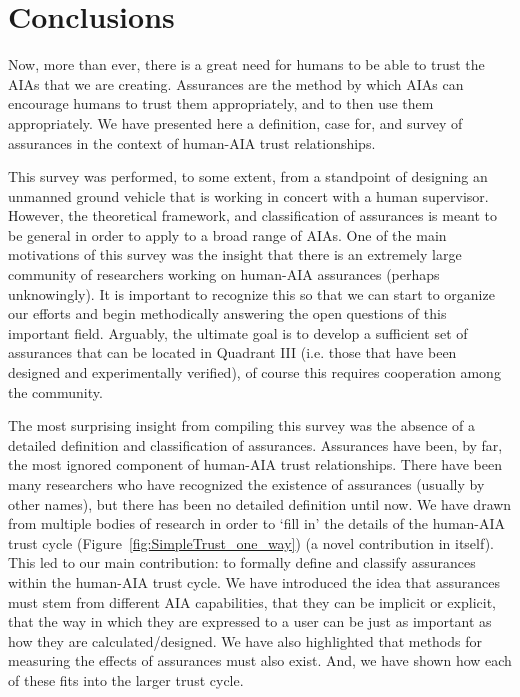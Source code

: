 \section{Conclusions}\label{sec:conclusions}
    Now, more than ever, there is a great need for humans to be able to trust the AIAs that we are creating. Assurances are the method by which AIAs can encourage humans to trust them appropriately, and to then use them appropriately. We have presented here a definition, case for, and survey of assurances in the context of human-AIA trust relationships.
    
    This survey was performed, to some extent, from a standpoint of designing an unmanned ground vehicle that is working in concert with a human supervisor. However, the theoretical framework, and classification of assurances is meant to be general in order to apply to a broad range of AIAs. One of the main motivations of this survey was the insight that there is an extremely large community of researchers working on human-AIA assurances (perhaps unknowingly). It is important to recognize this so that we can start to organize our efforts and begin methodically answering the open questions of this important field. Arguably, the ultimate goal is to develop a sufficient set of assurances that can be located in Quadrant III (i.e. those that have been designed and experimentally verified), of course this requires cooperation among the community.

    The most surprising insight from compiling this survey was the absence of a detailed definition and classification of assurances. Assurances have been, by far, the most ignored component of human-AIA trust relationships. There have been many researchers who have recognized the existence of assurances (usually by other names), but there has been no detailed definition until now. We have drawn from multiple bodies of research in order to `fill in' the details of the human-AIA trust cycle (Figure~\ref{fig:SimpleTrust_one_way}) (a novel contribution in itself). This led to our main contribution: to formally define and classify assurances within the human-AIA trust cycle. We have introduced the idea that assurances must stem from different AIA capabilities, that they can be implicit or explicit, that the way in which they are expressed to a user can be just as important as how they are calculated/designed. We have also highlighted that methods for measuring the effects of assurances must also exist. And, we have shown how each of these fits into the larger trust cycle.
    
